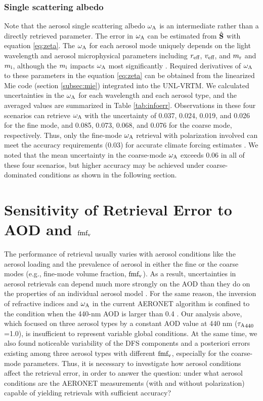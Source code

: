 \subsubsection{Single scattering albedo}

Note that the aerosol single scattering albedo $\omega_\text{A}$ is an intermediate rather
than a directly retrieved parameter. The error in $\omega_\text{A}$ can be estimated
from $\hat{\mathbf{S}}$ with equation \eqref{eq:zeta}. The $\omega_\text{A}$ for each
aerosol mode uniquely depends on the light wavelength and aerosol 
microphysical parameters including $r_\text{eff}$, $v_\text{eff}$, and $m_\text{r}$ and $m_\text{i}$,
although the $m_\text{i}$ impacts $\omega_\text{A}$ most significantly \citep{Hansen74}.
Required derivatives of $\omega_\text{A}$ to these parameters in the equation
\eqref{eq:zeta} can be obtained from the linearized Mie code (section
\ref{subsec:mie}) integrated into the UNL-VRTM. We calculated uncertainties 
in the $\omega_\text{A}$ for each wavelength and each aerosol type, and the averaged 
values are summarized in Table \ref{tab:infoerr}. Observations in these four 
scenarios can  retrieve $\omega_\text{A}$ with the uncertainty of 0.037, 0.024, 0.019, 
and 0.026 for  the fine mode, and 0.085, 0.073, 0.068, and 0.076 for the coarse
mode, respectively. Thus, only the fine-mode $\omega_\text{A}$ retrieval with polarization
involved can meet the accuracy requirements (0.03) for accurate climate forcing
estimates \citep{Mishchenko04}. We noted that the mean uncertainty in the
coarse-mode $\omega_\text{A}$ exceeds 0.06 in all of these four scenarios, but higher
accuracy may be achieved under coarse-dominated conditions as shown in the
following section.  

\section{Sensitivity of Retrieval Error to AOD and $\text{fmf}_\text{v}$} 
\label{sec:infosensi}

The performance of retrieval usually varies with aerosol conditions like
the aerosol loading and the prevalence of aerosol in either the fine or
the coarse modes (e.g., fine-mode volume fraction, $\text{fmf}_\text{v}$). As a result,
uncertainties in aerosol retrievals can depend much more strongly on the
AOD than they do on the properties of an individual aerosol model
\citep{Knobelspiesse12}. For the same reason, the inversion of
refractive indices and $\omega_\text{A}$ in the current AERONET algorithm is confined
to the condition when the 440-nm AOD is larger than 0.4
\citep{Dubovik00b, Holben06}. Our analysis above, which focused on three
aerosol types by a constant AOD value at 440 nm (${\tau_\text{A}}_{440}$=1.0), is
insufficient to represent variable global conditions. At the same time,
we also found noticeable variability of the DFS components and a
posteriori errors existing among three aerosol types with different
$\text{fmf}_\text{v}$, especially for the coarse-mode parameters. Thus, it is necessary
to investigate how aerosol conditions affect the retrieval error, in
order to answer the question: under what aerosol conditions are the AERONET
measurements (with and without polarization) capable of yielding
retrievals with sufficient accuracy?


